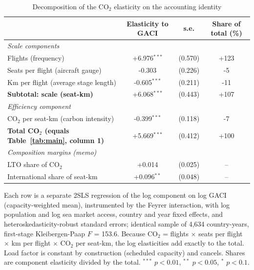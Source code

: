 \begin{table}[htbp]
\centering
\begin{threeparttable}
\caption{Decomposition of the CO$_2$ elasticity on the accounting identity}
\label{tab:decomp}
\footnotesize
\begin{tabular}{lccc}
\toprule
 & Elasticity to GACI & s.e. & Share of total (\%) \\
\midrule
\multicolumn{4}{l}{\textit{Scale components}} \\
  Flights (frequency) & +6.976$^{***}$ & (0.570) & +123 \\
  Seats per flight (aircraft gauge) & -0.303 & (0.226) & -5 \\
  Km per flight (average stage length) & -0.605$^{***}$ & (0.211) & -11 \\
  \textbf{Subtotal: scale (seat-km)} & +6.068$^{***}$ & (0.443) & +107 \\
\multicolumn{4}{l}{\textit{Efficiency component}} \\
  CO$_2$ per seat-km (carbon intensity) & -0.399$^{***}$ & (0.118) & -7 \\
\midrule
  \textbf{Total CO$_2$ (equals Table~\ref{tab:main}, column 1)} & +5.669$^{***}$ & (0.412) & +100 \\
\midrule
\multicolumn{4}{l}{\textit{Composition margins (memo)}} \\
  LTO share of CO$_2$ & +0.014 & (0.025) & -- \\
  International share of seat-km & +0.096$^{**}$ & (0.048) & -- \\
\bottomrule
\end{tabular}
\begin{tablenotes}\footnotesize
\item Each row is a separate 2SLS regression of the log component on log GACI (capacity-weighted mean), instrumented by the Feyrer interaction, with log population and log sea market access, country and year fixed effects, and heteroskedasticity-robust standard errors; identical sample of 4,634 country-years, first-stage Kleibergen-Paap $F$ = 153.6. Because CO$_2$ = flights $\times$ seats per flight $\times$ km per flight $\times$ CO$_2$ per seat-km, the log elasticities add exactly to the total. Load factor is constant by construction (scheduled capacity) and cancels. Shares are component elasticity divided by the total. $^{***}$ $p<0.01$, $^{**}$ $p<0.05$, $^{*}$ $p<0.1$.
\end{tablenotes}
\end{threeparttable}
\end{table}

